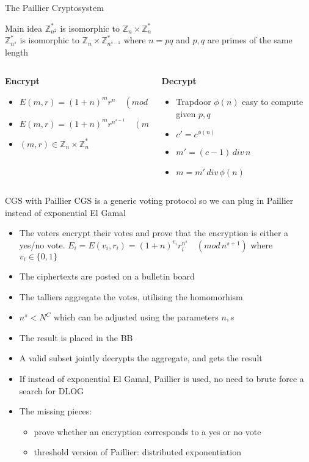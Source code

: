\documentclass{beamer}
\newcommand{\zns}[1]{ \mathbb{Z}_{#1}^* }
\newcommand{\zn}[1]{ \mathbb{Z}_{#1}}
\newcommand{\md}[1]{\quad (mod \, {#1})}
\begin{document}
\begin{frame}{The Paillier Cryptosystem}
\begin{block}{Main idea}
$\zns{n^2}$ is isomorphic to $\zn{n} \times \zns{n}$ \\
$\zns{n^s}$ is isomorphic to $\zn{n} \times \zns{n^{s-1}}$ 
 where $n=pq$ and $p,q$ are primes of the same length
\end{block}

\begin{columns}
		\begin{column}{0.5\textwidth}
		\textbf{Encrypt}
		\begin{itemize}
		\item $E(m,r) = (1+n)^m r^n \md{n^2}$
		\item $E(m,r) = (1+n)^m r^{n^{s-1}} \md{n^s}$
		\item $(m,r) \in \zn{n} \times \zns{n}$
		\end{itemize}
		\end{column}
 		\begin{column}{0.5\textwidth}
 		\textbf{Decrypt}
		\begin{itemize}
		\item Trapdoor $\phi(n)$ easy to compute given $p,q$
		\item $c' = c^{\phi(n)}$
		\item $m' = (c-1) \, div \, n$
		\item $m = m' \, div \, \phi(n)$
		\end{itemize}
 		\end{column}
\end{columns}
\end{frame}

\begin{frame}[allowframebreaks]{CGS with Paillier}
CGS is a generic voting protocol so we can plug in Paillier instead of exponential El Gamal
\begin{itemize}
\item The voters encrypt their votes and prove that the encryption is either a yes/no vote. 
$E_i = E(v_i,r_i) = (1+n)^{v_i} r_i ^{n^s} \md{n^{s+1}}$ where $v_i \in \{0,1\}$
\item The ciphertexts are posted on a bulletin board
\item The talliers aggregate the votes, utilising the homomorhism
\item $n^s< N^C$ which can be adjusted using the parameters $n,s$ 
\item The result is placed in the BB
\item A valid subset jointly decrypts the aggregate, and gets the result
\item If instead of exponential El Gamal, Paillier is used, no need to brute force a search for DLOG
\item The missing pieces: 
\begin{itemize}
	\item prove whether an encryption corresponds to a yes or no vote
	\item threshold version of Paillier: distributed exponentiation
\end{itemize}
\end{itemize}
\end{frame}
\end{document}
